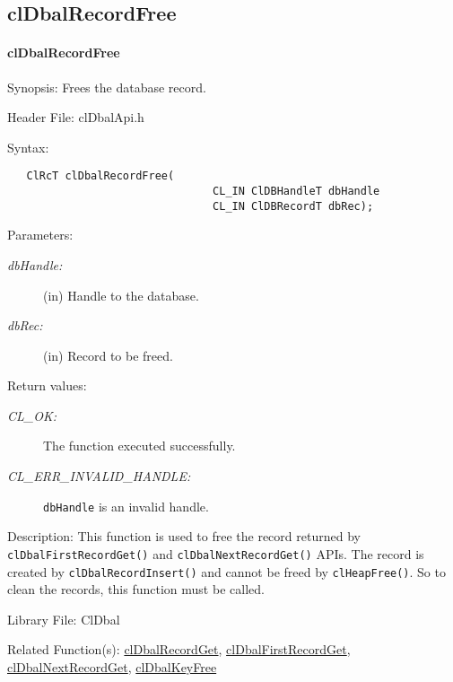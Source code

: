 \begin{flushleft}
\newpage
\subsection{clDbalRecordFree}
\hypertarget{pagedbal114}{}\paragraph{cl\-Dbal\-Record\-Free}\label{pagedbal114}
\begin{Desc}
\item[Synopsis:]Frees the database record.\end{Desc}
\begin{Desc}
\item[Header File:]clDbalApi.h\end{Desc}
\begin{Desc}
\item[Syntax:]

\footnotesize\begin{verbatim}   ClRcT clDbalRecordFree(
                          		CL_IN ClDBHandleT dbHandle
                          		CL_IN ClDBRecordT dbRec);
\end{verbatim}
\normalsize
\end{Desc}
\begin{Desc}
\item[Parameters:]
\begin{description}
\item[{\em db\-Handle:}](in) Handle to the database. \item[{\em db\-Rec:}](in) Record to be freed.\end{description}
\end{Desc}
\begin{Desc}
\item[Return values:]
\begin{description}
\item[{\em CL\_\-OK:}]The function executed successfully. 
\item[{\em CL\_\-ERR\_\-INVALID\_\-HANDLE:}]{\tt{dbHandle}} is an invalid handle.\end{description}
\end{Desc}
\begin{Desc}
\item[Description:]This function is used to free the record returned by {\tt{clDbalFirstRecordGet()}} and {\tt{clDbalNextRecordGet()}} APIs. The 
record is created by {\tt{clDbalRecordInsert()}} and cannot be freed by {\tt{cl\-Heap\-Free()}}. So to clean the records, this 
function must be called.\end{Desc}
\begin{Desc}
\item[Library File:]Cl\-Dbal\end{Desc}
\begin{Desc}
\item[Related Function(s):]\hyperlink{pagedbal107}{cl\-Dbal\-Record\-Get}, \hyperlink{pagedbal109}{cl\-Dbal\-First\-Record\-Get}, 
\hyperlink{pagedbal110}{cl\-Dbal\-Next\-Record\-Get}, \hyperlink{pagedbal115}{cl\-Dbal\-Key\-Free} \end{Desc}



\end{flushleft}
